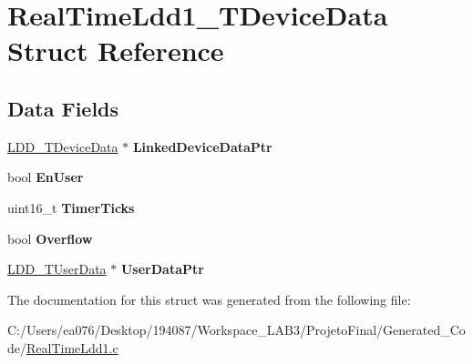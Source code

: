 \hypertarget{struct_real_time_ldd1___t_device_data}{\section{Real\-Time\-Ldd1\-\_\-\-T\-Device\-Data Struct Reference}
\label{struct_real_time_ldd1___t_device_data}
}
\subsection*{Data Fields}
\begin{DoxyCompactItemize}
\item 
\hypertarget{struct_real_time_ldd1___t_device_data_a536f95f486cb1abf881b21c29c18061b}{\hyperlink{group___p_e___types__module_gac5cf1362f1f0e3a2ce71b1bf2276d091}{L\-D\-D\-\_\-\-T\-Device\-Data} $\ast$ {\bfseries Linked\-Device\-Data\-Ptr}}\label{struct_real_time_ldd1___t_device_data_a536f95f486cb1abf881b21c29c18061b}

\item 
\hypertarget{struct_real_time_ldd1___t_device_data_a72cc79dab605fdc5717cb67e961dbdae}{bool {\bfseries En\-User}}\label{struct_real_time_ldd1___t_device_data_a72cc79dab605fdc5717cb67e961dbdae}

\item 
\hypertarget{struct_real_time_ldd1___t_device_data_ad562e58d1dc28ecfa4ae25acd2d19c5c}{uint16\-\_\-t {\bfseries Timer\-Ticks}}\label{struct_real_time_ldd1___t_device_data_ad562e58d1dc28ecfa4ae25acd2d19c5c}

\item 
\hypertarget{struct_real_time_ldd1___t_device_data_a5d269aad721134743615df0a455d6c30}{bool {\bfseries Overflow}}\label{struct_real_time_ldd1___t_device_data_a5d269aad721134743615df0a455d6c30}

\item 
\hypertarget{struct_real_time_ldd1___t_device_data_aa9df3c17607fd4189137f0bc0b8605fa}{\hyperlink{group___p_e___types__module_ga0b66a73f87238a782318aa0be7578e35}{L\-D\-D\-\_\-\-T\-User\-Data} $\ast$ {\bfseries User\-Data\-Ptr}}\label{struct_real_time_ldd1___t_device_data_aa9df3c17607fd4189137f0bc0b8605fa}

\end{DoxyCompactItemize}


The documentation for this struct was generated from the following file\-:\begin{DoxyCompactItemize}
\item 
C\-:/\-Users/ea076/\-Desktop/194087/\-Workspace\-\_\-\-L\-A\-B3/\-Projeto\-Final/\-Generated\-\_\-\-Code/\hyperlink{_real_time_ldd1_8c}{Real\-Time\-Ldd1.\-c}\end{DoxyCompactItemize}
